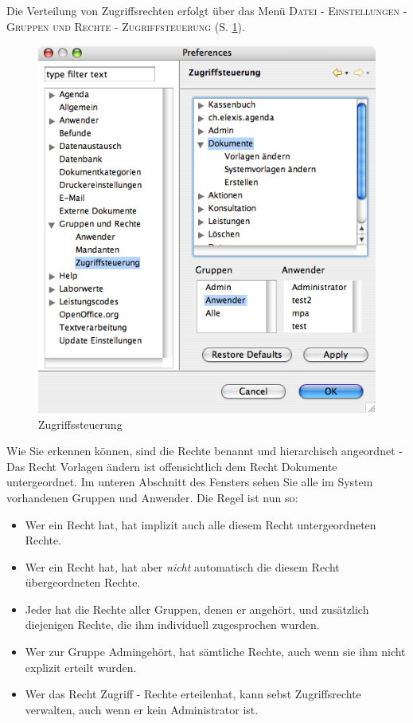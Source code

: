 Die Verteilung von Zugriffsrechten erfolgt über das Menü \textsc{Datei -
Einstellungen - Gruppen und Rechte - Zugriffsteuerung} (S. \ref{fig:zugriff}).
\begin{figure}[htp]
\begin{center}
  \includegraphics{images/zugriff}
  \caption{Zugriffssteuerung}
  \label{fig:zugriff}
\end{center}
\end{figure}

Wie Sie erkennen können, sind die Rechte benannt und hierarchisch angeordnet -
Das Recht \glqq Vorlagen ändern\grqq{} ist offensichtlich dem Recht \glqq
Dokumente\grqq{} untergeordnet. Im unteren Abschnitt des Fensters sehen Sie alle
im System vorhandenen Gruppen und Anwender. 
Die Regel ist nun so:
\begin{itemize}
  \item Wer ein Recht hat, hat implizit auch alle diesem Recht untergeordneten
  Rechte.
  \item Wer ein Recht hat, hat aber \textit{nicht} automatisch die diesem Recht
  übergeordneten Rechte.
  \item Jeder hat die Rechte aller Gruppen, denen er angehört, und zusätzlich
  diejenigen Rechte, die ihm individuell zugesprochen wurden.
  \item Wer zur Gruppe \glqq Admin\grqq gehört, hat sämtliche Rechte, auch wenn
  sie ihm nicht explizit erteilt wurden.
  \item Wer das Recht \glqq Zugriff - Rechte erteilen\grqq hat, kann sebst
  Zugriffsrechte verwalten, auch wenn er kein Administrator ist.
\end{itemize}

